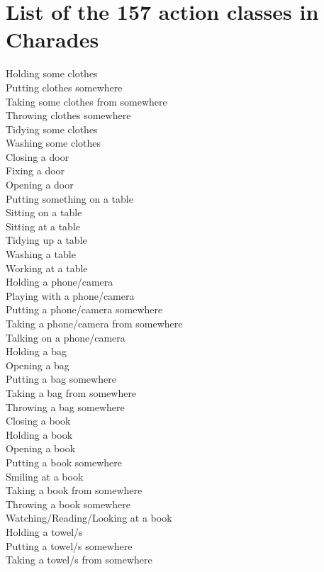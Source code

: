 \section{List of the 157 action classes in Charades}
\begin{multicols}{2}
\small
Holding some clothes \\
Putting clothes somewhere \\
Taking some clothes from somewhere \\
Throwing clothes somewhere \\
Tidying some clothes \\
Washing some clothes \\
Closing a door \\
Fixing a door \\
Opening a door \\
Putting something on a table \\
Sitting on a table \\
Sitting at a table \\
Tidying up a table \\
Washing a table \\
Working at a table \\
Holding a phone/camera \\
Playing with a phone/camera \\
Putting a phone/camera somewhere \\
Taking a phone/camera from somewhere \\
Talking on a phone/camera \\
Holding a bag \\
Opening a bag \\
Putting a bag somewhere \\
Taking a bag from somewhere \\
Throwing a bag somewhere \\
Closing a book \\
Holding a book \\
Opening a book \\
Putting a book somewhere \\
Smiling at a book \\
Taking a book from somewhere \\
Throwing a book somewhere \\
Watching/Reading/Looking at a book \\
Holding a towel/s \\
Putting a towel/s somewhere \\
Taking a towel/s from somewhere \\

\end{multicols}
